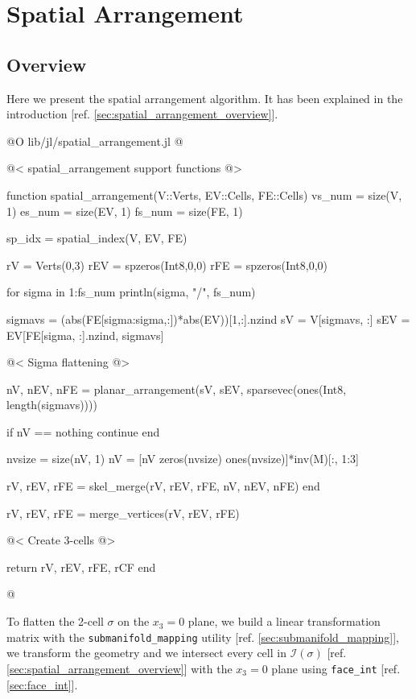 \chapter{Spatial Arrangement}

\section{Overview}
Here we present the spatial arrangement algorithm.
It has been explained in the introduction [ref. \ref{sec:spatial_arrangement_overview}].

@O lib/jl/spatial_arrangement.jl
@{@< spatial\_arrangement support functions @>

function spatial_arrangement(V::Verts, EV::Cells, FE::Cells)
    vs_num = size(V, 1)
    es_num = size(EV, 1)
    fs_num = size(FE, 1)

    sp_idx = spatial_index(V, EV, FE)

    rV = Verts(0,3)
    rEV = spzeros(Int8,0,0)
    rFE = spzeros(Int8,0,0)

    for sigma in 1:fs_num
        println(sigma, "/", fs_num)

        sigmavs = (abs(FE[sigma:sigma,:])*abs(EV))[1,:].nzind 
        sV = V[sigmavs, :]
        sEV = EV[FE[sigma, :].nzind, sigmavs]

        @< Sigma flattening @>

        nV, nEV, nFE = planar_arrangement(sV, sEV, sparsevec(ones(Int8, length(sigmavs))))

        if nV == nothing
            continue
        end
        
        nvsize = size(nV, 1)
        nV = [nV zeros(nvsize) ones(nvsize)]*inv(M)[:, 1:3]

        rV, rEV, rFE = skel_merge(rV, rEV, rFE, nV, nEV, nFE)
    end

    rV, rEV, rFE = merge_vertices(rV, rEV, rFE)

    @< Create 3-cells @>

    return rV, rEV, rFE, rCF
end

@}

To flatten the 2-cell $\sigma$ on the $x_3=0$ plane,
we build a linear transformation matrix with the
\texttt{submanifold\_mapping} utility [ref. \ref{sec:submanifold_mapping}],
we transform the geometry and we intersect every cell in $\mathcal{I}(\sigma)$
[ref. \ref{sec:spatial_arrangement_overview}]
with the $x_3=0$ plane using \texttt{face\_int} [ref. \ref{sec:face_int}].


